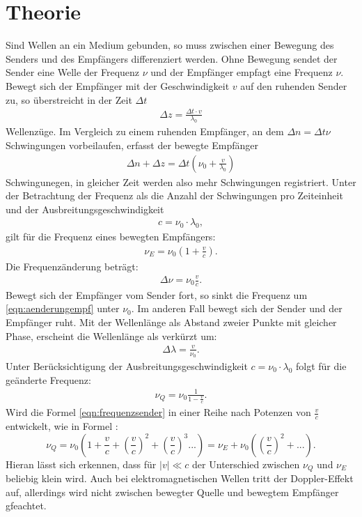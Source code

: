 \section{Theorie}
\label{sec:Theorie}
Sind Wellen an ein Medium gebunden,
so muss zwischen einer Bewegung des Senders und des Empfängers differenziert werden.
Ohne Bewegung sendet der Sender eine Welle der Frequenz $\nu$ und der Empfänger
empfagt eine Frequenz $\nu$.
Bewegt sich der Empfänger mit der Geschwindigkeit $v$ auf den ruhenden Sender zu,
so überstreicht in der Zeit $\Delta t$
\begin{align}
  \Delta z=\frac{\Delta t\cdot v}{\lambda_0}
\end{align}
Wellenzüge.
Im Vergleich zu einem ruhenden Empfänger, an dem $\Delta n= \Delta t\nu$ Schwingungen
vorbeilaufen, erfasst der bewegte Empfänger
\begin{align}
  \Delta n + \Delta z = \Delta t \left(\nu_0 +\frac{v}{\lambda_0}\right)
\end{align}
Schwingunegen, in gleicher Zeit werden also mehr Schwingungen registriert.
Unter der Betrachtung der Frequenz als die Anzahl der Schwingungen pro
Zeiteinheit und der Ausbreitungsgeschwindigkeit
\begin{align}
c=\nu_0\cdot\lambda_0 \label{eqn:c},
\end{align}
gilt für die Frequenz eines bewegten Empfängers:
\begin{align}
  \nu_E=\nu_0\left(1+\frac{v}{c}\right)\label{eqn:frequenzempf}.
\end{align}
Die Frequenzänderung beträgt:
\begin{align}
  \Delta\nu=\nu_0\frac{v}{c}\label{eqn:aenderungempf}.
\end{align}
Bewegt sich der Empfänger vom Sender fort, so sinkt die Frequenz um \eqref{eqn:aenderungempf}
unter $\nu_0$.
Im anderen Fall bewegt sich der Sender und der Empfänger ruht.
Mit der Wellenlänge als Abstand zweier Punkte mit gleicher Phase, erscheint
die Wellenlänge als verkürzt um:
\begin{align}
  \Delta\lambda=\frac{v}{\nu_0}.
\end{align}
Unter Berücksichtigung der Ausbreitungsgeschwindigkeit $c=\nu_0\cdot\lambda_0$
folgt für die geänderte Frequenz:
\begin{align}
  \nu_Q=\nu_0\frac{1}{1-\frac{v}{c}}\label{eqn:frequenzsender}.
\end{align}
Wird die Formel \eqref{eqn:frequenzsender} in einer Reihe nach Potenzen von $\frac{v}{c}$
entwickelt, wie in Formel :
\begin{equation}
  \nu_Q=\nu_0\left(1+\frac{v}{c}+\left(\frac{v}{c} \right)^2+\left(\frac{v}{c}\right)^3...\right)= \nu_E +\nu_0\left(\left(\frac{v}{c}\right)^2+...\right).
\end{equation}
Hieran lässt sich erkennen, dass für $\lvert v \rvert \ll c$ der Unterschied zwischen
$\nu_Q$ und $\nu_E$ beliebig klein wird.
Auch bei elektromagnetischen Wellen tritt der Doppler-Effekt
auf, allerdings wird nicht zwischen bewegter Quelle und bewegtem Empfänger gfeachtet.
